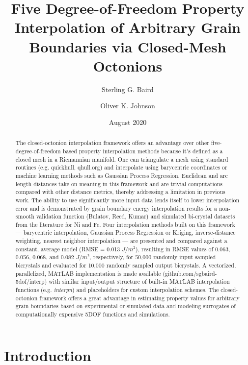 \documentclass[preprint,12pt]{elsarticle}
\title{Five Degree-of-Freedom Property Interpolation of Arbitrary Grain Boundaries via Closed-Mesh Octonions}
\author{Sterling G. Baird}
\author{Oliver K. Johnson}
\date{August 2020}
\begin{document}
\begin{abstract}
    The closed-octonion interpolation framework offers an advantage over other five-degree-of-freedom based property interpolation methods because it's defined as a closed mesh in a Riemannian manifold. One can triangulate a mesh using standard routines (e.g. quickhull, qhull.org) and interpolate using barycentric coordinates or machine learning methods such as Gaussian Process Regression. Euclidean and arc length distances take on meaning in this framework and are trivial computations compared with other distance metrics, thereby addressing a limitation in previous work. The ability to use significantly more input data lends itself to lower interpolation error and is demonstrated by grain boundary energy interpolation results for a non-smooth validation function (Bulatov, Reed, Kumar) and simulated bi-crystal datasets from the literature for Ni and Fe. Four interpolation methods built on this framework --- barycentric interpolation, Gaussian Process Regression or Kriging, inverse-distance weighting, nearest neighbor interpolation --- are presented and compared against a constant, average model (RMSE = 0.013 $J/m^2$), resulting in RMSE values of 0.063, 0.056, 0.068, and 0.082 $J/m^2$, respectively, for 50,000 randomly input sampled bicrystals and evaluated for 10,000 randomly sampled output bicrystals. A vectorized, parallelized, MATLAB implementation is made available (github.com/sgbaird-5dof/interp) with similar input/output structure of built-in MATLAB interpolation functions (e.g. \textit{interpn}) and placeholders for custom interpolation schemes. The closed-octonion framework offers a great advantage in estimating property values for arbitrary grain boundaries based on experimental or simulated data and modeling surrogates of computationally expensive 5DOF functions and simulations.
\end{abstract}

\maketitle

\section{Introduction} \label{sec:intro}
\end{document}
